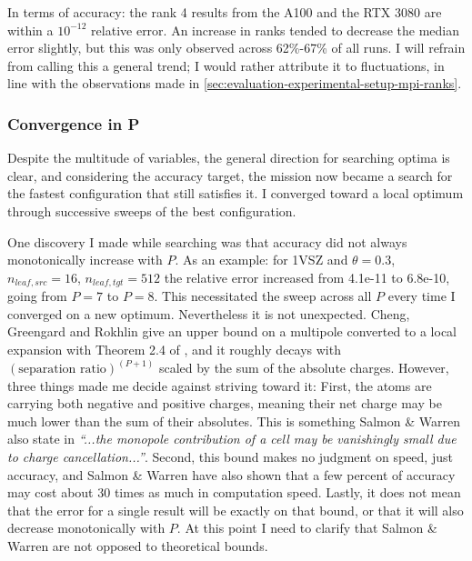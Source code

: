 In terms of accuracy: the rank 4 results from the A100 and the RTX 3080 are within a $10^{-12}$ relative error.
An increase in ranks tended to decrease the median error slightly, but this was only observed across 62\%-67\% of all runs.
I will refrain from calling this a general trend; I would rather attribute it to fluctuations, in line with the observations made in \ref{sec:evaluation-experimental-setup-mpi-ranks}.




\subsubsection{Convergence in P}

Despite the multitude of variables, the general direction for searching optima is clear, and considering the accuracy target, the mission now became a search for the fastest configuration that still satisfies it.
I converged toward a local optimum through successive sweeps of the best configuration.

One discovery I made while searching was that accuracy did not always monotonically increase with $P$.
As an example: for 1VSZ and $\theta = 0.3$, $n_{leaf,src} = 16$, $n_{leaf,tgt} = 512$ the relative error increased from 4.1e-11 to 6.8e-10, going from $P = 7$ to $P = 8$.
This necessitated the sweep across all $P$ every time I converged on a new optimum.
Nevertheless it is not unexpected.
Cheng, Greengard and Rokhlin give an upper bound on a multipole converted to a local expansion with Theorem 2.4 of \cite{cheng1999fastadaptive}, and it roughly decays with $(\text{separation ratio})^{(P+1)}$ scaled by the sum of the absolute charges.
However, three things made me decide against striving toward it:
First, the atoms are carrying both negative and positive charges, meaning their net charge may be much lower than the sum of their absolutes.
This is something Salmon \& Warren also state in \cite{salmon1994skeletons} \textit{``...the monopole contribution of a cell may be vanishingly small due to charge cancellation...''}.
Second, this bound makes no judgment on speed, just accuracy, and Salmon \& Warren have also shown that a few percent of accuracy may cost about 30 times as much in computation speed.
Lastly, it does not mean that the error for a single result will be exactly on that bound, or that it will also decrease monotonically with $P$.
At this point I need to clarify that Salmon \& Warren are not opposed to theoretical bounds.

